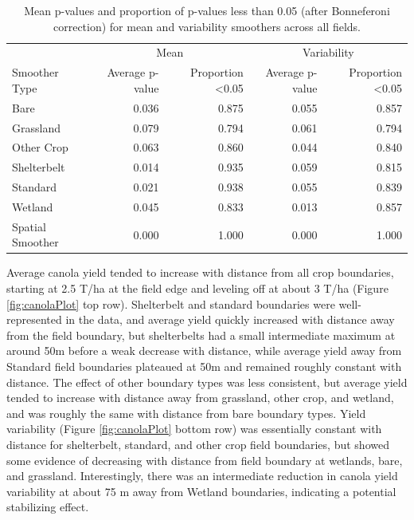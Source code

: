 \documentclass[]{elsarticle} %
\begin{document}
\begin{table}

\caption{\label{tab:smoothSummary}Mean p-values and proportion of p-values less than 0.05 (after Bonneferoni correction) for mean and variability smoothers across all fields.}
\centering
\begin{tabular}[t]{l|r|r|r|r}
\hline
\multicolumn{1}{c|}{} & \multicolumn{2}{c|}{Mean} & \multicolumn{2}{c}{Variability} \\
\cline{2-3} \cline{4-5}
Smoother Type & Average p-value & Proportion <0.05 & Average p-value & Proportion <0.05\\
\hline
Bare & 0.036 & 0.875 & 0.055 & 0.857\\
\hline
Grassland & 0.079 & 0.794 & 0.061 & 0.794\\
\hline
Other Crop & 0.063 & 0.860 & 0.044 & 0.840\\
\hline
Shelterbelt & 0.014 & 0.935 & 0.059 & 0.815\\
\hline
Standard & 0.021 & 0.938 & 0.055 & 0.839\\
\hline
Wetland & 0.045 & 0.833 & 0.013 & 0.857\\
\hline
Spatial Smoother & 0.000 & 1.000 & 0.000 & 1.000\\
\hline
\end{tabular}
\end{table}

Average canola yield tended to increase with distance from all crop boundaries, starting at 2.5 T/ha at the field edge and leveling off at about 3 T/ha (Figure \ref{fig:canolaPlot} top row).
Shelterbelt and standard boundaries were well-represented in the data, and average yield quickly increased with distance away from the field boundary, but shelterbelts had a small intermediate maximum at around 50m before a weak decrease with distance, while average yield away from Standard field boundaries plateaued at 50m and remained roughly constant with distance.
The effect of other boundary types was less consistent, but average yield tended to increase with distance away from grassland, other crop, and wetland, and was roughly the same with distance from bare boundary types.
Yield variability (Figure \ref{fig:canolaPlot} bottom row) was essentially constant with distance for shelterbelt, standard, and other crop field boundaries, but showed some evidence of decreasing with distance from field boundary at wetlands, bare, and grassland.
Interestingly, there was an intermediate reduction in canola yield variability at about 75 m away from Wetland boundaries, indicating a potential stabilizing effect.
\end{document}
